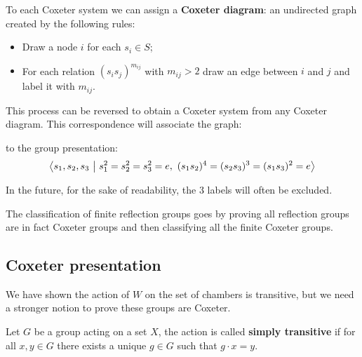 \documentclass[../main.tex]{subfiles}
\begin{document}
To each Coxeter system we can assign a \textbf{Coxeter diagram}: an undirected graph created by the following rules:\begin{itemize}
    \item Draw a node $i$ for each $s_i\in S$;
    \item For each relation $(s_i s_j)^{m_{ij}}$ with $m_{ij}>2$ draw an edge between $i$ and $j$ and label it with $m_{ij}$.
\end{itemize}

This process can be reversed to obtain a Coxeter system from any Coxeter diagram. This correspondence will associate the graph:
\begin{figure}[!h]
\centering
{}
\end{figure}

to the group presentation: \[
\left\langle s_1,s_2,s_3 \ \middle| \ s_1^2 = s_2^2 = s_3^2 = e, \ (s_1s_2)^4 = (s_2s_3)^3 = (s_1s_3)^2 = e \right\rangle
\]

In the future, for the sake of readability, the $3$ labels will often be excluded.

The classification of finite reflection groups goes by proving all reflection groups are in fact Coxeter groups and then classifying all the finite Coxeter groups.

\subsection{Coxeter presentation}

We have shown the action of $W$ on the set of chambers is transitive, but we need a stronger notion to prove these groups are Coxeter.

\begin{definition}
    Let $G$ be a group acting on a set $X$, the action is called \textbf{simply transitive} if for all $x,y\in G$ there exists a unique $g\in G$ such that $g\cdot x = y$.
\end{definition}
\end{document}
